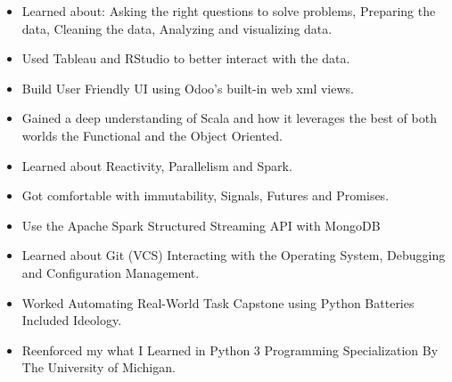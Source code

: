 \documentclass[10pt,a4paper,ragged2e,withhyper]{altacv}
\begin{document}
\begin{paracol}{2}


   \begin{itemize}
      \item Learned about: Asking the right questions to solve problems, Preparing the data, Cleaning the data, Analyzing and visualizing data.
      \item Used Tableau and RStudio to better interact with the data.
      \item Build User Friendly UI using Odoo's built-in web xml views.
   \end{itemize}

   \divider
   
   
   \begin{itemize}
      \item Gained a deep understanding of Scala and how it leverages the best of both worlds the Functional and the Object Oriented.
      \item Learned about Reactivity, Parallelism and Spark.
      \item Got comfortable with immutability, Signals, Futures and Promises.
      \item Use the Apache Spark Structured Streaming API with MongoDB
   \end{itemize}
   
   \divider

   \begin{itemize}
      \item Learned about Git (VCS) Interacting with the Operating System, Debugging and Configuration Management. 
      \item Worked Automating Real-World Task Capstone using Python Batteries Included Ideology.
      \item Reenforced my what I Learned in Python 3 Programming Specialization By The University of Michigan.
   \end{itemize}
   \divider



\end{paracol}
\end{document}

